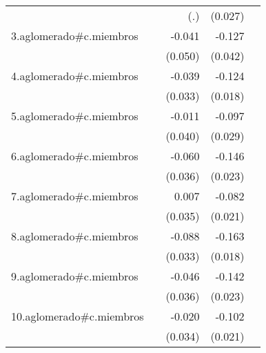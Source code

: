 {\begin{longtable}{l*{4}{D{.}{.}{-1}}}
            &                     &         (.)         &     (0.027)         &                     \\
\addlinespace
3.aglomerado#c.miembros&                     &      -0.041         &      -0.127\sym{**} &                     \\
            &                     &     (0.050)         &     (0.042)         &                     \\
\addlinespace
4.aglomerado#c.miembros&                     &      -0.039         &      -0.124\sym{***}&                     \\
            &                     &     (0.033)         &     (0.018)         &                     \\
\addlinespace
5.aglomerado#c.miembros&                     &      -0.011         &      -0.097\sym{***}&                     \\
            &                     &     (0.040)         &     (0.029)         &                     \\
\addlinespace
6.aglomerado#c.miembros&                     &      -0.060         &      -0.146\sym{***}&                     \\
            &                     &     (0.036)         &     (0.023)         &                     \\
\addlinespace
7.aglomerado#c.miembros&                     &       0.007         &      -0.082\sym{***}&                     \\
            &                     &     (0.035)         &     (0.021)         &                     \\
\addlinespace
8.aglomerado#c.miembros&                     &      -0.088\sym{**} &      -0.163\sym{***}&                     \\
            &                     &     (0.033)         &     (0.018)         &                     \\
\addlinespace
9.aglomerado#c.miembros&                     &      -0.046         &      -0.142\sym{***}&                     \\
            &                     &     (0.036)         &     (0.023)         &                     \\
\addlinespace
10.aglomerado#c.miembros&                     &      -0.020         &      -0.102\sym{***}&                     \\
            &                     &     (0.034)         &     (0.021)         &                     \\

\end{longtable}}
